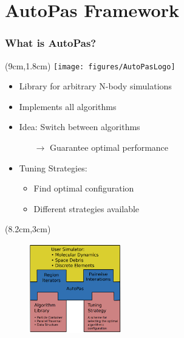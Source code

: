 \documentclass[
	10pt,
	t		%
]{beamer}
\begin{document}
\section{AutoPas Framework}

\begin{frame}
    \frametitle{What is AutoPas?}

    \begin{textblock*}{5cm}(9cm,1.8cm)
        \texttt{[image: figures/AutoPasLogo]}
    \end{textblock*}

    \begin{itemize}
        \item Library for arbitrary N-body simulations
        \item Implements all algorithms
        \item Idea: Switch between algorithms
              \begin{itemize}
                  \item[$\rightarrow$] Guarantee optimal performance
              \end{itemize}

        \item Tuning Strategies:
              \begin{itemize}
                  \item Find optimal configuration
                  \item Different strategies available
              \end{itemize}
    \end{itemize}

    \begin{textblock*}{4cm}(8.2cm,3cm)
        \begin{figure}
            \includegraphics[width=4cm]{figures/AutoPasLibraryStructure.png}
            \caption{ \scriptsize{\cite{Newcome2023Poster}}}

        \end{figure}
    \end{textblock*}

\end{frame}
\end{document}
